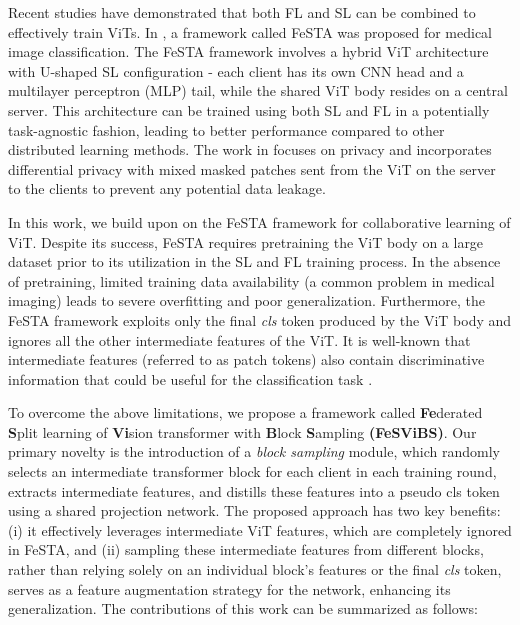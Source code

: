 \documentclass[runningheads]{llncs}
\begin{document}
Recent studies \cite{oh2022differentially,visonVits} have demonstrated that both FL and SL can be combined to effectively train ViTs. In \cite{visonVits}, a framework called FeSTA was proposed for medical image classification. The FeSTA framework involves a hybrid ViT architecture with U-shaped SL configuration - each client has its own CNN head and a multilayer perceptron (MLP) tail, while the shared ViT body resides on a central server. This architecture can be trained using both SL and FL in a potentially task-agnostic fashion, leading to better performance compared to other distributed learning methods. The work in \cite{oh2022differentially} focuses on privacy and incorporates differential privacy with mixed masked patches sent from the ViT on the server to the clients to prevent any potential data leakage.

In this work, we build upon on the FeSTA framework \cite{visonVits} for collaborative learning of ViT. Despite its success, FeSTA requires pretraining the ViT body on a large dataset prior to its utilization in the SL and FL training process. In the absence of pretraining, limited training data availability (a common problem in medical imaging) leads to severe overfitting and poor generalization. Furthermore, the FeSTA framework exploits only the final \emph{cls} token produced by the ViT body and ignores all the other intermediate features of the ViT. It is well-known that intermediate features (referred to as patch tokens) also contain discriminative information that could be useful for the classification task \cite{farispaper}. 

To overcome the above limitations, we propose a framework called \textbf{Fe}derated \textbf{S}plit learning of \textbf{Vi}sion transformer with \textbf{B}lock \textbf{S}ampling \textbf{(FeSViBS)}. Our primary novelty is the introduction of a \emph{block sampling} module, which randomly selects an intermediate transformer block for each client in each training round, extracts intermediate features, and distills these features into a pseudo cls token using a shared projection network. The proposed approach has two key benefits: (i) it effectively leverages intermediate ViT features, which are completely ignored in FeSTA, and (ii) sampling these intermediate features from different blocks, rather than relying solely on an individual block's features or the final \emph{cls} token, serves as a feature augmentation strategy for the network, enhancing its generalization. The contributions of this work can be summarized as follows:
\end{document}
